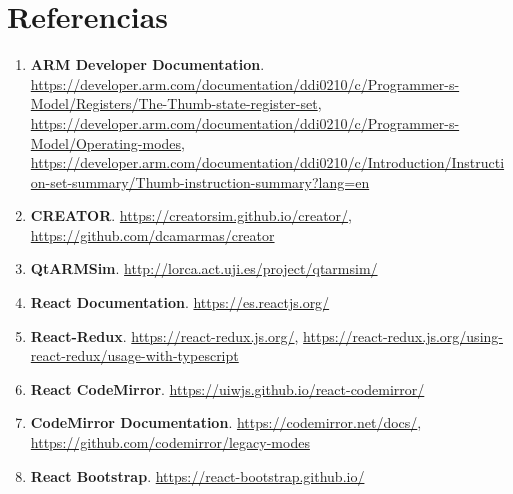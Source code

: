 \newpage
\section{Referencias}
{
    \begin{enumerate}
        \item \textbf{ARM Developer Documentation}.
            \href{https://developer.arm.com/documentation/ddi0210/c/Programmer-s-Model/Registers/The-Thumb-state-register-set}{https://developer.arm.com/documentation/ddi0210/c/Programmer-s-Model/Registers/The-Thumb-state-register-set}, 
            \href{https://developer.arm.com/documentation/ddi0210/c/Programmer-s-Model/Operating-modes}{https://developer.arm.com/documentation/ddi0210/c/Programmer-s-Model/Operating-modes},
            \href{https://developer.arm.com/documentation/ddi0210/c/Introduction/Instruction-set-summary/Thumb-instruction-summary?lang=en}{https://developer.arm.com/documentation/ddi0210/c/Introduction/Instruction-set-summary/Thumb-instruction-summary?lang=en}
        \item \textbf{CREATOR}. \href{https://creatorsim.github.io/creator/}{https://creatorsim.github.io/creator/}, \href{https://github.com/dcamarmas/creator}{https://github.com/dcamarmas/creator}
        \item \textbf{QtARMSim}. \href{http://lorca.act.uji.es/project/qtarmsim/}{http://lorca.act.uji.es/project/qtarmsim/}
        \item \textbf{React Documentation}. \href{https://es.reactjs.org/}{https://es.reactjs.org/}
        \item \textbf{React-Redux}. \href{https://react-redux.js.org/}{https://react-redux.js.org/}, \href{https://react-redux.js.org/using-react-redux/usage-with-typescript}{https://react-redux.js.org/using-react-redux/usage-with-typescript}
        \item \textbf{React CodeMirror}. \href{https://uiwjs.github.io/react-codemirror/}{https://uiwjs.github.io/react-codemirror/}
        \item \textbf{CodeMirror Documentation}. \href{https://codemirror.net/docs/}{https://codemirror.net/docs/}, \href{https://github.com/codemirror/legacy-modes}{https://github.com/codemirror/legacy-modes}
        \item \textbf{React Bootstrap}. \href{https://react-bootstrap.github.io/}{https://react-bootstrap.github.io/}
    \end{enumerate}
}

